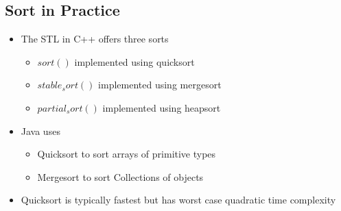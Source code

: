 





\begin{slide}
\section[-1]{Sort in Practice}

\begin{PauseHighLight}
  \begin{itemize}
  \item The STL in C++ offers three sorts
    \begin{itemize}
    \item \jl$sort()$ implemented using quicksort\pause
    \item \jl$stable_sort()$ implemented using mergesort\pause
    \item \jl$partial_sort()$ implemented using heapsort\pause
    \end{itemize}
  \item Java uses
    \begin{itemize}
    \item Quicksort to sort arrays of primitive types\pause
    \item Mergesort to sort Collections of objects\pause
    \end{itemize}
  \item Quicksort is typically fastest but has worst case quadratic time
    complexity\pause
  \end{itemize}
\end{PauseHighLight}

\end{slide}


